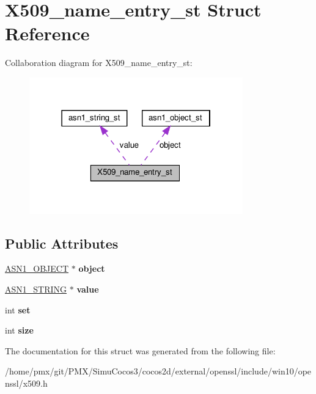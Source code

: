 \hypertarget{structX509__name__entry__st}{}\section{X509\+\_\+name\+\_\+entry\+\_\+st Struct Reference}
\label{structX509__name__entry__st}


Collaboration diagram for X509\+\_\+name\+\_\+entry\+\_\+st\+:
\nopagebreak
\begin{figure}[H]
\begin{center}
\leavevmode
\includegraphics[width=262pt]{structX509__name__entry__st__coll__graph}
\end{center}
\end{figure}
\subsection*{Public Attributes}
\begin{DoxyCompactItemize}
\item 
\mbox{\label{structX509__name__entry__st_afb5c2cccc0186d9b6c232d1abee1600d}} 
\hyperlink{structasn1__object__st}{A\+S\+N1\+\_\+\+O\+B\+J\+E\+CT} $\ast$ {\bfseries object}
\item 
\mbox{\label{structX509__name__entry__st_ac667219a50c24b022ad59fbd4b0161dd}} 
\hyperlink{structasn1__string__st}{A\+S\+N1\+\_\+\+S\+T\+R\+I\+NG} $\ast$ {\bfseries value}
\item 
\mbox{\label{structX509__name__entry__st_a9c2a931466331baa5b1566029e4e2159}} 
int {\bfseries set}
\item 
\mbox{\label{structX509__name__entry__st_a26441098da53088784c4eb95d3a2d2f7}} 
int {\bfseries size}
\end{DoxyCompactItemize}


The documentation for this struct was generated from the following file\+:\begin{DoxyCompactItemize}
\item 
/home/pmx/git/\+P\+M\+X/\+Simu\+Cocos3/cocos2d/external/openssl/include/win10/openssl/x509.\+h\end{DoxyCompactItemize}
